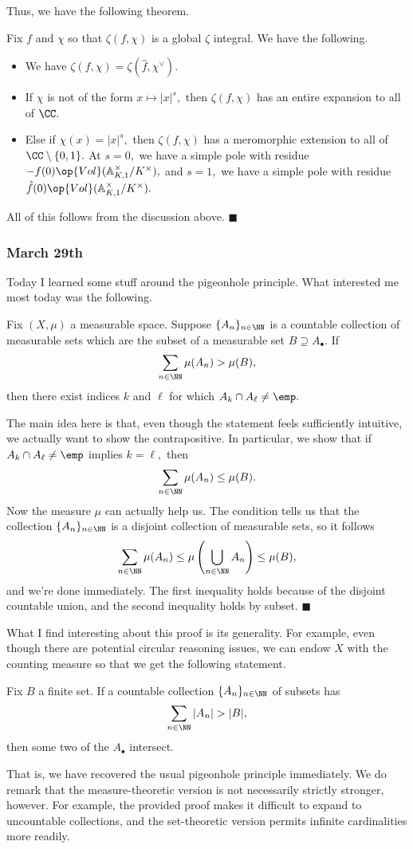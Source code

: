 Thus, we have the following theorem.
\begin{theorem}
    Fix $f$ and $\chi$ so that $\zeta(f,\chi)$ is a global $\zeta$ integral. We have the following.
    \begin{itemize}
        \item We have $\zeta(f,\chi)=\zeta(\hat f,\chi^\vee).$
        \item If $\chi$ is not of the form $x\mapsto|x|^s,$ then $\zeta(f,\chi)$ has an entire expansion to all of $\CC.$
        \item Else if $\chi(x)=|x|^s,$ then $\zeta(f,\chi)$ has a meromorphic extension to all of $\CC\setminus\{0,1\}.$ At $s=0,$ we have a simple pole with residue $-f(0)\op{Vol}(\mathbb A^\times_{K,1}/K^\times),$ and $s=1,$ we have a simple pole with residue $\hat f(0)\op{Vol}(\mathbb A^\times _{K,1}/K^\times).$
    \end{itemize}
\end{theorem}
All of this follows from the discussion above. $\blacksquare$

\subsubsection{March 29th}
Today I learned some stuff around the pigeonhole principle. What interested me most today was the following.
\begin{proposition}
    Fix $(X,\mu)$ a measurable space. Suppose $\{A_n\}_{n\in\NN}$ is a countable collection of measurable sets which are the subset of a measurable set $B\supseteq A_\bullet.$ If
    \[\sum_{n\in\NN}\mu(A_n)>\mu(B),\]
    then there exist indices $k$ and $\ell$ for which $A_k\cap A_\ell\ne\emp.$
\end{proposition}
The main idea here is that, even though the statement feels sufficiently intuitive, we actually want to show the contrapositive. In particular, we show that if $A_k\cap A_\ell\ne\emp$ implies $k=\ell,$ then
\[\sum_{n\in\NN}\mu(A_n)\le\mu(B).\]
Now the measure $\mu$ can actually help us. The condition tells us that the collection $\{A_n\}_{n\in\NN}$ is a disjoint collection of measurable sets, so it follows
\[\sum_{n\in\NN}\mu(A_n)\le\mu\left(\bigcup_{n\in\NN}A_n\right)\le\mu(B),\]
and we're done immediately. The first inequality holds because of the disjoint countable union, and the second inequality holds by subset. $\blacksquare$

What I find interesting about this proof is its generality. For example, even though there are potential circular reasoning issues, we can endow $X$ with the counting measure so that we get the following statement.
\begin{proposition}
    Fix $B$ a finite set. If a countable collection $\{A_n\}_{n\in\NN}$ of subsets has
    \[\sum_{n\in\NN}|A_n|>|B|,\]
    then some two of the $A_\bullet$ intersect.
\end{proposition}
That is, we have recovered the usual pigeonhole principle immediately. We do remark that the measure-theoretic version is not necessarily strictly stronger, however. For example, the provided proof makes it difficult to expand to uncountable collections, and the set-theoretic version permits infinite cardinalities more readily.

